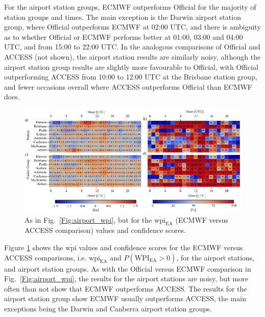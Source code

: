 \documentclass[alpha-refs]{wiley-article}
\begin{document}
For the airport station groups, ECMWF outperforms Official for the majority of station groups and times. The main exception is the Darwin airport station group, where Official outperforms ECMWF at 02:00 UTC, and there is ambiguity as to whether Official or ECMWF performs better at 01:00, 03:00 and 04:00 UTC, and from 15:00 to 22:00 UTC. In the analogous comparisons of Official and ACCESS (not shown), the airport station results are similarly noisy, although the airport station group results are slightly more favourable to Official, with Official outperforming ACCESS from 10:00 to 12:00 UTC at the Brisbane station group, and fewer occasions overall where ACCESS outperforms Official than ECMWF does. 

\begin{figure}
\centering
\includegraphics{airport_wpi_EA.pdf}
\caption{As in Fig.~\ref{Fig:airport_wpi}, but for the $\overline{\text{wpi}}_\text{EA}$ (ECMWF versus ACCESS comparison) values and confidence scores.}   
\label{Fig:airport_wpi_EA}
\end{figure}

Figure \ref{Fig:airport_wpi_EA} shows the $\overline{\text{wpi}}$ values and confidence scores for the ECMWF versus ACCESS comparisons, i.e. $\overline{\text{wpi}}_\text{EA}$ and $P\left(\overline{\text{WPI}}_\text{EA}>0\right)$, for the airport stations, and airport station groups. As with the Official versus ECMWF comparison in Fig.~\ref{Fig:airport_wpi}, the results for the airport stations are noisy, but more often than not show that ECMWF outperforms ACCESS. The results for the airport station group show ECMWF usually outperforms ACCESS, the main exceptions being the Darwin and Canberra airport station groups. 
\end{document}
